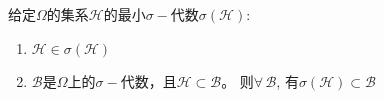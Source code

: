\begin{smallestsigmaalgebraset}
    给定$\Omega$的集系$\mathscr{H}$的最小$\sigma-$代数$\sigma(\mathscr{H})$:
    \begin{enumerate}
        \item$\mathscr{H}\in\sigma(\mathscr{H})$
        \item$\mathscr{B}$是$\Omega$上的$\sigma-$代数，且$\mathscr{H}\subset\mathscr{B}$。%
            则$\forall\,\mathscr{B}$, 有$\sigma(\mathscr{H})\subset\mathscr{B}$
    \end{enumerate}
\end{smallestsigmaalgebraset}
